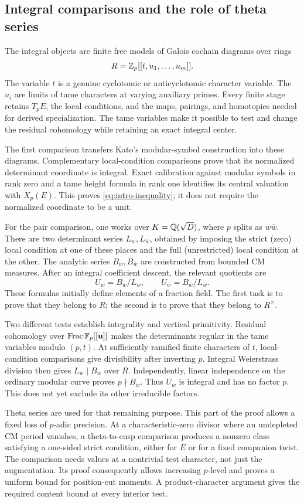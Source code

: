 \subsection{Integral comparisons and the role of theta series}

The integral objects are finite free models of Galois cochain diagrams
over rings
\[
 R=\mathbb Z_p[[t,u_1,\ldots,u_m]].
\]
The variable $t$ is a genuine cyclotomic or anticyclotomic character
variable. The $u_i$ are limits of tame characters at varying auxiliary
primes. Every finite stage retains $T_pE$, the local conditions, and
the maps, pairings, and homotopies needed for derived specialization.
The tame variables make it possible to test and change the residual
cohomology while retaining an exact integral center.

The first comparison transfers Kato's modular-symbol construction into
these diagrams. Complementary local-condition comparisons prove that
its normalized determinant coordinate is integral. Exact calibration
against modular symbols in rank zero and a tame height formula in rank
one identifies its central valuation with $X_p(E)$. This proves
\eqref{eq:intro-inequality}; it does not require the normalized coordinate
to be a unit.

For the pair comparison, one works over
$K=\mathbb Q(\sqrt D)$, where $p$ splits as $w\bar w$. There are two determinant
series $L_w,L_{\bar w}$, obtained by imposing the strict (zero) local
condition at one of these places and the full (unrestricted) local
condition at the other. The analytic
series $B_w,B_{\bar w}$ are constructed from bounded CM measures.
After an integral coefficient descent, the relevant quotients are
\[
 U_w=B_w/L_w,\qquad U_{\bar w}=B_{\bar w}/L_{\bar w}.
\]
These formulas initially define elements of a fraction field. The
first task is to prove that they belong to $R$; the second is to prove
that they belong to $R^\times$.

Two different tests establish integrality and vertical primitivity.
Residual cohomology over $\operatorname{Frac}\mathbb F_p[[\mathbf u]]$ makes the determinants
regular in the tame variables modulo $(p,t)$. At sufficiently ramified
finite characters of $t$, local-condition comparisons give divisibility
after inverting $p$. Integral Weierstrass division then gives
$L_w\mid B_w$ over $R$. Independently, linear independence on the
ordinary modular curve proves $p\nmid B_w$. Thus $U_w$ is integral
and has no factor $p$. This does not yet exclude its other irreducible
factors.

Theta series are used for that remaining purpose. This part of the
proof allows a fixed loss of $p$-adic precision. At a characteristic-zero
divisor where an undepleted CM period vanishes, a theta-to-cusp
comparison produces a nonzero class satisfying a one-sided strict
condition, either for $E$ or for a fixed companion twist. The
comparison needs values at a nontrivial test character, not just the
augmentation. Its proof consequently allows increasing $p$-level and
proves a uniform bound for position-cut moments. A product-character
argument gives the required content bound at every interior test.

